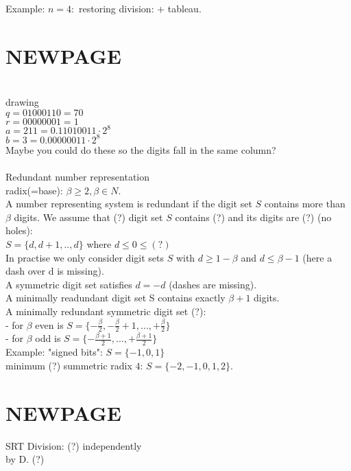 Example: $n=4:$ restoring division: + tableau. \\
\bigskip

\section*{NEWPAGE} \\
drawing \\

$q= 01000110=70$ \\
$r= 00000001=1$ \\
$a=211=0.11010011\cdot 2^8$ \\
$b=3=0.00000011\cdot 2^8$ \\
Maybe you could do these so the digits fall in the same column?\\

\\

Redundant number representation\\
radix(=base): $\beta\ge 2, \beta\in N$. \\

A number representing system is redundant if the digit set $S$ contains more than $\beta$ digits. We assume that (?) digit set $S$ contains (?) and its digits are (?) (no holes): \\

$S=\{d,d+1,..,d\}$ where $d\le 0\le (?)$ \\

In practise we only consider digit sets $S$ with $d\ge 1-\beta$ and $d\le \beta-1$ (here a dash over d is missing). \\

A symmetric digit set satisfies $d=-d$ (dashes are missing). \\

A minimally readundant digit set S contains exactly $\beta+1$ digits. \\

A minimally redundant symmetric digit set (?): \\
- for $\beta$ even is $S=\{-\frac{\beta}{2},-\frac{\beta}{2}+1,...,+\frac{\beta}{2}\}$ \\
- for $\beta$ odd is $S=\{-\frac{\beta+1}{2},...,+\frac{\beta+1}{2}\}$ \\

Example: "signed bits": $S=\{-1,0,1\}$\\
minimum (?) summetric radix $4$: $S=\{-2,-1,0,1,2\}$. \bigskip

\section*{NEWPAGE}
SRT Division: (?) independently\\
by D. (?) \\

